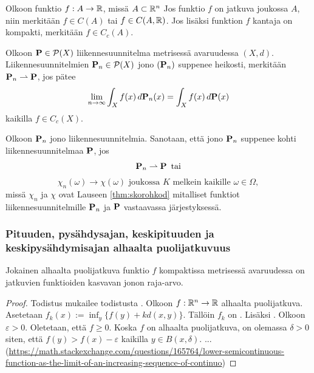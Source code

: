 \begin{definition}
    Olkoon funktio $f: A \to \R$, missä $A\subset \R^n$ Jos funktio $f$ on jatkuva joukossa $A$, niin merkitään $f \in C(A)$ tai $f \in C(A, \R)$. Jos lisäksi funktion $f$ kantaja on kompakti, merkitään $f \in C_c(A)$.
\end{definition}

\begin{definition} \label{def:weakConv}
    Olkoon $\P \in \mathcal{P}(X)$ liikennesuunnitelma metrisessä avaruudessa $(X, d)$. Liikennesuunnitelmien $\P_n \in \mathcal{P}(X)$ jono $(\P_n)$ suppenee heikosti, merkitään $\P_n \rightharpoonup \P$, jos pätee 
    \begin{equation*}
        \lim_{n\to\infty} \int_X f(x) \, d\P_n (x) = \int_X f(x) \, d\P(x)
    \end{equation*}
    kaikilla $f \in C_c(X)$.
\end{definition}

\begin{definition}
    Olkoon $\P_n$ jono liikennesuunnitelmia. Sanotaan, että jono $\P_n$ suppenee kohti liikennesuunnitelmaa $\P$, jos 
    $$\P_n \rightharpoonup \P \, \text{ tai}$$
    $$ \chi_n (\omega) \to  \chi (\omega) \text{ joukossa } K \text{ melkein kaikille } \omega
    \in \Omega,$$
    missä $ \chi_n$ ja $ \chi$ ovat Lauseen \ref{thm:skorohkod} mitalliset funktiot liikennesuunnitelmille $\P_n$ ja $\P$ vastaavassa järjestyksessä.
\end{definition}

\subsubsection{Pituuden, pysähdysajan, keskipituuden ja keskipysähdymisajan alhaalta puolijatkuvuus}

\begin{lemma}\label{le:LSCisLimitOfC-Functions}
    Jokainen alhaalta puolijatkuva funktio $f$ kompaktissa metrisessä avaruudessa on jatkuvien funktioiden kasvavan jonon raja-arvo.
\end{lemma}

\begin{proof}
    Todistus mukailee todistusta \cite[p. 30]{OptimalTransportationNetworks}. Olkoon $f:\R^n \to \R$ alhaalta puolijatkuva. Asetetaan $\displaystyle f_k(x) := \inf_y\{f(y) + kd(x,y)\}$. Tällöin $f_k$ on . Lisäksi .
    Olkoon $\varepsilon > 0$. Oletetaan, että $f \ge 0$. Koska $f$ on alhaalta puolijatkuva, on olemassa $\delta > 0$ siten, että $f(y) > f(x) - \varepsilon$ kaikilla $y \in B(x, \delta).$ ... (\url{https://math.stackexchange.com/questions/165764/lower-semicontinuous-function-as-the-limit-of-an-increasing-sequence-of-continuo})
\end{proof}

